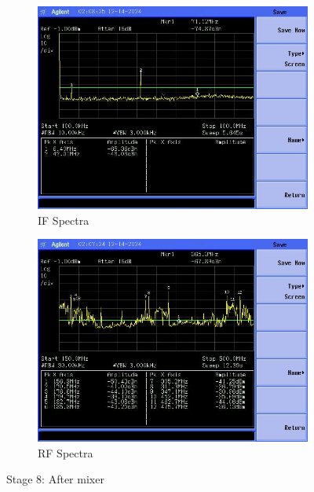 \documentclass[letterpaper,12pt]{article}
\begin{document}
\begin{figure}[H]
	\begin{subfigure}[t]{.49\textwidth}
		\centering
		\includegraphics[width=\linewidth]{figures/receiver_spectra/8.mixer.lower}
		\caption{IF Spectra}
	  \end{subfigure}
	  \hfill
	  \begin{subfigure}[t]{.49\textwidth}
		\centering
		\includegraphics[width=\linewidth]{figures/receiver_spectra/8.mixer.upper}
		\caption{RF Spectra}
	  \end{subfigure}

	  \vspace{0.5cm}
	  \caption{Stage 8: After mixer}
\end{figure}
\end{document}
